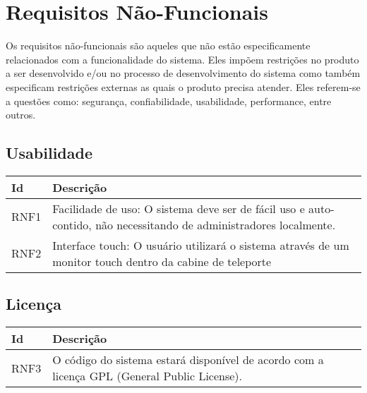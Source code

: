 \documentclass[a4paper,10pt]{article}
\begin{document}
\section{Requisitos Não-Funcionais}

Os requisitos não-funcionais são aqueles que não estão especificamente relacionados com a funcionalidade do sistema. Eles impõem restrições no produto a ser desenvolvido e/ou no processo de desenvolvimento do sistema como também especificam restrições externas as quais o produto precisa atender. Eles referem-se a questões como: segurança, confiabilidade, usabilidade, performance, entre outros.

\subsection{Usabilidade}

\begin{center}
    \begin{longtable}{ | l | p{10cm} |}
    \hline
    Id & Descrição \\ \hline
    RNF1 & Facilidade de uso: O sistema deve ser de fácil uso e auto-contido, não necessitando de administradores localmente.\\ \hline
    RNF2 & Interface touch: O usuário utilizará o sistema através de um monitor touch dentro da cabine de teleporte\\ \hline
    \end{longtable}
\end{center}

\subsection{Licença}

\begin{center}
    \begin{longtable}{ | l | p{10cm} |}
    \hline
    Id & Descrição \\ \hline
    RNF3 & O código do sistema estará disponível de acordo com a licença GPL (General Public License).\\ \hline
    \end{longtable}
\end{center}
\end{document}
